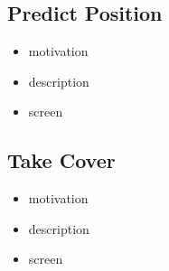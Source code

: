 \subsection{Predict Position}
\begin{itemize}
	\item motivation
	\item description
	\item screen
\end{itemize}

\subsection{Take Cover}
\begin{itemize}
	\item motivation
	\item description
	\item screen
\end{itemize}

